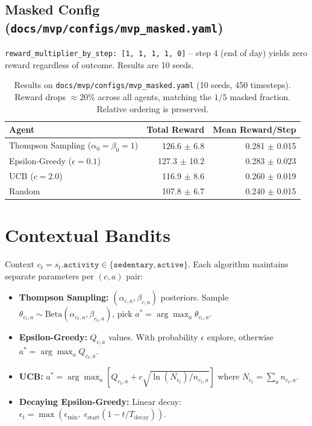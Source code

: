 \documentclass[11pt]{article}
\begin{document}
\subsection{Masked Config (\texttt{docs/mvp/configs/mvp\_masked.yaml})}
\texttt{reward\_multiplier\_by\_step: [1, 1, 1, 1, 0]} -- step 4 (end of day) yields zero reward regardless of outcome. Results are 10 seeds.

\begin{table}[h]
\centering
\begin{tabular}{lrr}
\toprule
Agent & Total Reward & Mean Reward/Step \\
\midrule
Thompson Sampling ($\alpha_0=\beta_0=1$) & 126.6 $\pm$ 6.8 & 0.281 $\pm$ 0.015 \\
Epsilon-Greedy ($\epsilon=0.1$) & 127.3 $\pm$ 10.2 & 0.283 $\pm$ 0.023 \\
UCB ($c=2.0$) & 116.9 $\pm$ 8.6 & 0.260 $\pm$ 0.019 \\
Random & 107.8 $\pm$ 6.7 & 0.240 $\pm$ 0.015 \\
\bottomrule
\end{tabular}
\caption{Results on \texttt{docs/mvp/configs/mvp\_masked.yaml} (10 seeds, 450 timesteps). Reward drops $\approx 20\%$ across all agents, matching the $1/5$ masked fraction. Relative ordering is preserved.}
\end{table}

\section{Contextual Bandits}\label{sec:contextual}

Context $c_t = s_t.\texttt{activity} \in \{\texttt{sedentary}, \texttt{active}\}$. Each algorithm maintains separate parameters per $(c, a)$ pair:

\begin{itemize}
  \item \textbf{Thompson Sampling:} $(\alpha_{c,a}, \beta_{c,a})$ posteriors. Sample $\theta_{c_t, a} \sim \text{Beta}(\alpha_{c_t, a}, \beta_{c_t, a})$, pick $a^* = \arg\max_a \theta_{c_t, a}$.
  \item \textbf{Epsilon-Greedy:} $Q_{c,a}$ values. With probability $\epsilon$ explore, otherwise $a^* = \arg\max_a Q_{c_t, a}$.
  \item \textbf{UCB:} $a^* = \arg\max_a \left[ Q_{c_t, a} + c \sqrt{\ln(N_{c_t}) / n_{c_t, a}} \right]$ where $N_{c_t} = \sum_a n_{c_t, a}$.
  \item \textbf{Decaying Epsilon-Greedy:} Linear decay: $\epsilon_t = \max(\epsilon_{\min},\; \epsilon_{\text{start}} (1 - t / T_{\text{decay}}))$.
\end{itemize}
\end{document}
